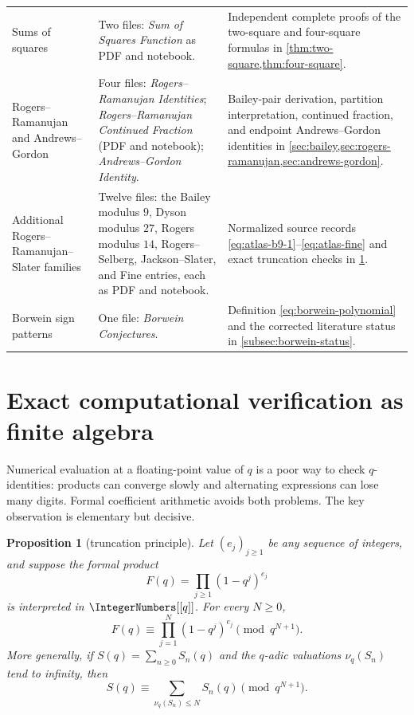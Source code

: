 \documentclass[11pt,oneside]{article}
\newtheorem{proposition}[theorem]{Proposition}
\theoremstyle{definition}
\begin{document}
\begin{longtable}{>{\raggedright\arraybackslash}p{}
                  >{\raggedright\arraybackslash}p{}
                  >{\raggedright\arraybackslash}p{}}
Sums of squares &
Two files: \emph{Sum of Squares Function} as PDF and notebook. &
Independent complete proofs of the two-square and four-square formulas in
\cref{thm:two-square,thm:four-square}.\\[0.25em]
Rogers--Ramanujan and Andrews--Gordon &
Four files: \emph{Rogers--Ramanujan Identities};
\emph{Rogers--Ramanujan Continued Fraction} (PDF and notebook);
\emph{Andrews--Gordon Identity}. &
Bailey-pair derivation, partition interpretation, continued fraction, and
endpoint Andrews--Gordon identities in
\cref{sec:bailey,sec:rogers-ramanujan,sec:andrews-gordon}.\\[0.25em]
Additional Rogers--Ramanujan--Slater families &
Twelve files: the Bailey modulus $9$, Dyson modulus $27$, Rogers modulus
$14$, Rogers--Selberg, Jackson--Slater, and Fine entries, each as PDF and
notebook. &
Normalized source records \eqref{eq:atlas-b9-1}--\eqref{eq:atlas-fine} and
exact truncation checks in \cref{sec:verification}.\\[0.25em]
Borwein sign patterns &
One file: \emph{Borwein Conjectures}. &
Definition \eqref{eq:borwein-polynomial} and the corrected literature status
in \cref{subsec:borwein-status}.\\
\end{longtable}
\endgroup


\section{Exact computational verification as finite algebra}
\label{sec:verification}

Numerical evaluation at a floating-point value of $q$ is a poor way to check
$q$-identities: products can converge slowly and alternating expressions can
lose many digits.  Formal coefficient arithmetic avoids both problems.
The key observation is elementary but decisive.

\begin{proposition}[truncation principle]\label{prop:truncation}
Let $(e_j)_{j\ge1}$ be any sequence of integers, and suppose the formal
product
\[
 F(q)=\prod_{j\ge1}(1-q^j)^{e_j}
\]
is interpreted in $\IntegerNumbers[[q]]$.  For every $N\ge0$,
\begin{equation}\label{eq:truncation-product}
 F(q)\equiv\prod_{j=1}^{N}(1-q^j)^{e_j}
 \pmod{q^{N+1}}.
\end{equation}
More generally, if $S(q)=\sum_{n\ge0}S_n(q)$ and the $q$-adic valuations
$\nu_q(S_n)$ tend to infinity, then
\begin{equation}\label{eq:truncation-series}
 S(q)\equiv\sum_{\nu_q(S_n)\le N}S_n(q)
 \pmod{q^{N+1}}.
\end{equation}
\end{proposition}
\end{document}
